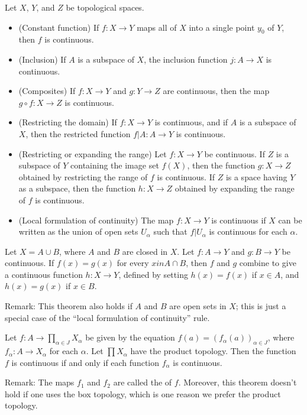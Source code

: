 Let $X$, $Y$, and $Z$ be topological spaces.
\begin{itemize}
	\item (Constant function) If $f: X \to Y$ maps all of $X$ into 
	a single point $y_0$ of $Y$, then $f$ is continuous.
	
	\item (Inclusion) If $A$ is a subspace of $X$, the inclusion 
	function $j: A \to X$ is continuous.
	
	\item (Composites) If $f:X \to Y$ and $g:Y \to Z$ are 
	continuous, then the map $g \circ f:X \to Z$ is continuous.
	
	\item (Restricting the domain) If $f:X \to Y$ is continuous, 
	and if $A$ is a subspace of $X$, then the restricted function 
	$f|A:A \to Y$ is continuous.
	
	\item (Restricting or expanding the range) Let $f:X \to Y$ be 
	continuous. If $Z$ is a subspace of $Y$ containing the image 
	set $f(X)$, then the function $g:X \to Z$ obtained by 
	restricting the range of $f$ is continuous. If $Z$ is a space 
	having $Y$ as a subspace, then the function $h:X \to Z$ 
	obtained by expanding the range of $f$ is continuous.
	
	\item (Local formulation of continuity) The map $f:X \to Y$ is 
	continuous if $X$ can be written as the union of open sets 
	$U_\alpha$ such that $f|U_\alpha$ is continuous for each 
	$\alpha$.
\end{itemize}

\begin{theorem}
	Let $X = A \cup B$, where $A$ and $B$ are closed in $X$. Let 
	$f:A \to Y$ and $g:B \to Y$ be continuous. If $f(x) = g(x)$ for 
	every $x in A \cap B$, then $f$ and $g$ combine to give a 
	continuous function $h:X \to Y$, defined by setting $h(x) = 
	f(x)$ if $x \in A$, and $h(x) = g(x)$ if $x \in B$.
\end{theorem}
Remark: This theorem also holds if $A$ and $B$ are open sets in 
$X$; this is just a special case of the ``local formulation of 
continuity'' rule.

\begin{theorem}
	Let $f:A \to \prod_{\alpha \in J} X_\alpha$ be given by the 
	equation $f(a) = (f_\alpha(a))_{\alpha \in J}$, where 
	$f_\alpha:A \to X_\alpha$ for each $\alpha$. Let $\prod 
	X_\alpha$ have the product topology. Then the function $f$ is 
	continuous if and only if each function $f_\alpha$ is 
	continuous.
\end{theorem}
Remark: The maps $f_1$ and $f_2$ are called the  of $f$. Moreover, 
this theorem doesn't hold if one uses the box topology, which is 
one reason we prefer the product topology.

